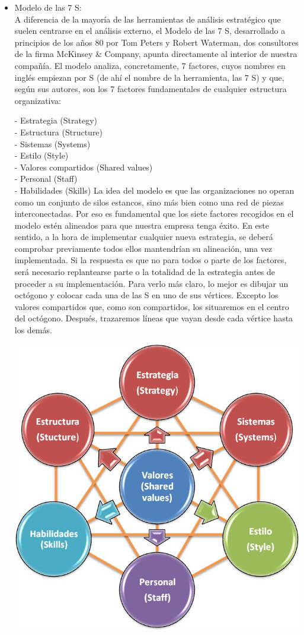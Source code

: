 	\begin{itemize}
\item Modelo de las 7 S:
\\A diferencia de la mayoría de las herramientas de análisis estratégico que suelen centrarse en el análisis externo, el Modelo de las 7 S, desarrollado a principios de los años 80 por Tom Peters y Robert Waterman, dos consultores de la firma McKinsey & Company, apunta directamente al interior de nuestra compañía. El modelo analiza, concretamente, 7 factores, cuyos nombres en inglés empiezan por S (de ahí el nombre de la herramienta, las 7 S) y que, según sus autores, son los 7 factores fundamentales de cualquier estructura organizativa:

- Estrategia (Strategy)\\
- Estructura (Structure)\\
- Sistemas (Systems)\\
- Estilo (Style)\\
- Valores compartidos (Shared values)\\
- Personal (Staff)\\
- Habilidades (Skills)
La idea del modelo es que las organizaciones no operan como un conjunto de silos estancos, sino más bien como una red de piezas interconectadas. Por eso es fundamental que los siete factores recogidos en el modelo estén alineados para que nuestra empresa tenga éxito. En este sentido, a la hora de implementar cualquier nueva estrategia, se deberá comprobar previamente todos ellos mantendrían su alineación, una vez implementada. Si la respuesta es que no para todos o parte de los factores, será necesario replantearse parte o la totalidad de la estrategia antes de proceder a su implementación. Para verlo más claro, lo mejor es dibujar un octógono y colocar cada una de las S en uno de sus vértices. Excepto los valores compartidos que, como son compartidos, los situaremos en el centro del octógono. Después, trazaremos líneas que vayan desde cada vértice hasta los demás.
		\begin{center}
		\includegraphics[width=15cm]{./Imagenes/Imagen4}

\end{center}
\end{itemize}
